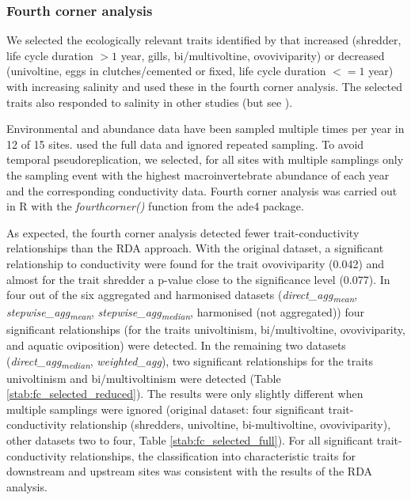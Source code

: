 \documentclass[12pt]{article}
\begin{document}
\subsubsection*{Fourth corner analysis}

We selected the ecologically relevant traits identified by \citet{szocs_effects_2014} that increased (shredder, life cycle duration $ > 1 $ year, gills, bi/multivoltine, ovoviviparity) or decreased (univoltine, eggs in clutches/cemented or fixed, life cycle duration $ <= 1$ year) with increasing salinity and used these in the fourth corner analysis. The selected traits also responded to salinity in other studies (but see \cite{szocs_effects_2014}). 

Environmental and abundance data have been sampled multiple times per year in 12 of 15 sites. \citet{szocs_effects_2014} used the full data and ignored repeated sampling. To avoid temporal pseudoreplication, we selected, for all sites with multiple samplings only the sampling event with the highest macroinvertebrate abundance of each year and the corresponding conductivity data. Fourth corner analysis was carried out in R with the \textit{fourthcorner()} function from the ade4 package.

As expected, the fourth corner analysis detected fewer trait-conductivity relationships than the RDA approach. With the original dataset, a significant relationship to conductivity were found for the trait ovoviviparity (0.042) and almost for the trait shredder a p-value close to the significance level (0.077). In four out of the six aggregated and harmonised datasets (\textit{direct\_agg\textsubscript{mean}}, \textit{stepwise\_agg\textsubscript{mean}}, \textit{stepwise\_agg\textsubscript{median}}, harmonised (not aggregated)) four significant relationships (for the traits univoltinism, bi/multivoltine, ovoviviparity, and aquatic oviposition) were detected. In the remaining two datasets (\textit{direct\_agg\textsubscript{median}}, \textit{weighted\_agg}), two significant relationships for the traits univoltinism and bi/multivoltinism were detected (Table \ref{stab:fc_selected_reduced}). The results were only slightly different when multiple samplings were ignored (original dataset: four significant trait-conductivity relationship (shredders, univoltine, bi-multivoltine, ovoviviparity), other datasets two to four, Table \ref{stab:fc_selected_full}). For all significant trait-conductivity relationships, the classification into characteristic traits for downstream and upstream sites was consistent with the results of the RDA analysis.
\end{document}
